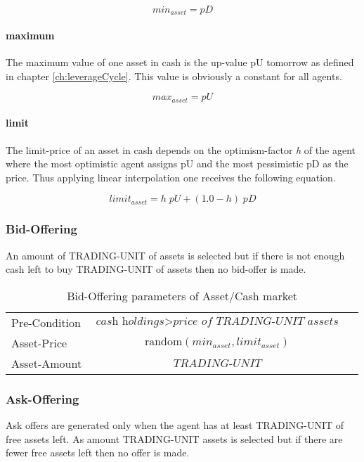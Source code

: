 \documentclass[Bachelorarbeit.tex]{subfiles}
\begin{document}
\begin{equation}
min_{asset} = \textit{pD}
\end{equation}

\paragraph{maximum}
The maximum value of one asset in cash is the up-value pU tomorrow as defined in chapter \ref{ch:leverageCycle}. This value is obviously a constant for all agents.

\begin{equation}
max_{asset} = \textit{pU}
\end{equation}

\paragraph{limit}
The limit-price of an asset in cash depends on the optimism-factor \textit{h} of the agent where the most optimistic agent assigns pU and the most pessimistic pD as the price. Thus applying linear interpolation one receives the following equation.

\begin{equation}
limit_{asset} = h \; pU + ( 1.0 - h ) \; pD
\end{equation}

\subsubsection{Bid-Offering}
An amount of TRADING-UNIT of assets is selected but if there is not enough cash left to buy TRADING-UNIT of assets then no bid-offer is made.

\begin{table}[H]
	\centering
	\caption{Bid-Offering parameters of Asset/Cash market}
	\begin{tabular} { l c r }
		\hline
		Pre-Condition & $\textit{cash holdings} > \textit{price of TRADING-UNIT assets}$  \\
		Asset-Price & $\mathrm{random}(min_{asset}, limit_{asset})$ \\
		Asset-Amount & $\textit{TRADING-UNIT}$ \\
		\hline
	\end{tabular}
\end{table}

\subsubsection{Ask-Offering}
Ask offers are generated only when the agent has at least TRADING-UNIT of free assets left. As amount TRADING-UNIT assets is selected but if there are fewer free assets left then no offer is made.
\end{document}

